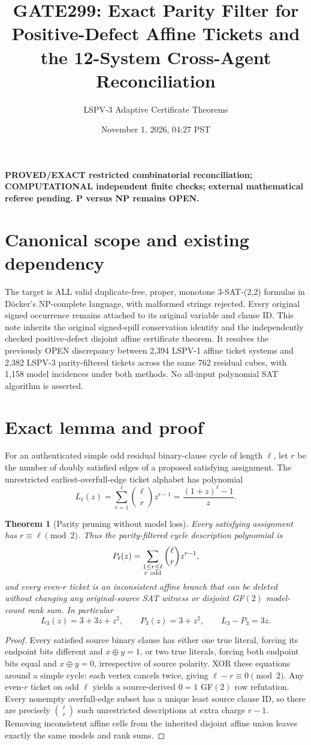 \documentclass[11pt]{article}
\title{GATE299: Exact Parity Filter for Positive-Defect Affine Tickets and the 12-System Cross-Agent Reconciliation}
\author{LSPV-3 Adaptive Certificate Theorems}
\date{November 1, 2026, 04:27 PST}
\newtheorem{theorem}{Theorem}
\begin{document}
\maketitle
\noindent\textbf{PROVED/EXACT restricted combinatorial reconciliation; COMPUTATIONAL independent finite checks; external mathematical referee pending. P versus NP remains OPEN.}
\section*{Canonical scope and existing dependency}
The target is ALL valid duplicate-free, proper, monotone 3-SAT-(2,2) formulas in D\"ocker's NP-complete language, with malformed strings rejected. Every original signed occurrence remains attached to its original variable and clause ID. This note inherits the original signed-spill conservation identity and the independently checked positive-defect disjoint affine certificate theorem. It resolves the previously OPEN discrepancy between 2,394 LSPV-1 affine ticket systems and 2,382 LSPV-3 parity-filtered tickets across the same 762 residual cubes, with 1,158 model incidences under both methods. No all-input polynomial SAT algorithm is asserted.
\section*{Exact lemma and proof}
For an authenticated simple odd residual binary-clause cycle of length $\ell$, let $r$ be the number of doubly satisfied edges of a proposed satisfying assignment. The unrestricted earliest-overfull-edge ticket alphabet has polynomial
\[
L_\ell(z)=\sum_{r=1}^{\ell}\binom{\ell}{r}z^{r-1}=\frac{(1+z)^\ell-1}{z}.
\]
\begin{theorem}[Parity pruning without model loss]
Every satisfying assignment has $r\equiv\ell\pmod2$. Thus the parity-filtered cycle description polynomial is
\[
P_\ell(z)=\sum_{\substack{1\le r\le\ell\\r\ {\rm odd}}}\binom{\ell}{r}z^{r-1},
\]
and every even-$r$ ticket is an inconsistent affine branch that can be deleted without changing any original-source SAT witness or disjoint GF$(2)$ model-count rank sum. In particular
\[
L_3(z)=3+3z+z^2,\qquad P_3(z)=3+z^2,\qquad L_3-P_3=3z.
\]
\end{theorem}
\begin{proof}
Every satisfied source binary clause has either one true literal, forcing its endpoint bits different and $x\oplus y=1$, or two true literals, forcing both endpoint bits equal and $x\oplus y=0$, irrespective of source polarity. XOR these equations around a simple cycle: each vertex cancels twice, giving $\ell-r\equiv0\pmod2$. Any even-$r$ ticket on odd $\ell$ yields a source-derived $0=1$ GF$(2)$ row refutation. Every nonempty overfull-edge subset has a unique least source clause ID, so there are precisely $\binom{\ell}{r}$ such unrestricted descriptions at extra charge $r-1$. Removing inconsistent affine cells from the inherited disjoint affine union leaves exactly the same models and rank sums.
\end{proof}
\end{document}
